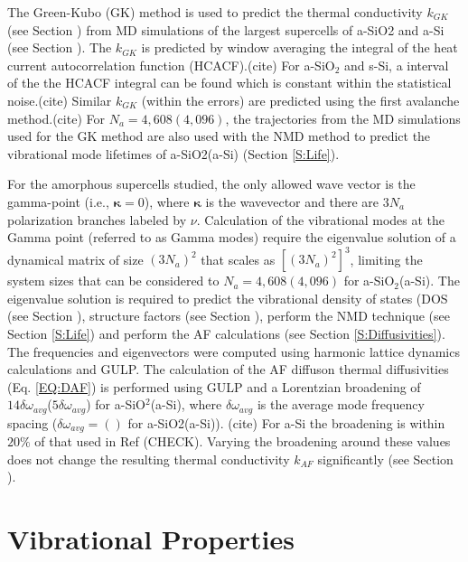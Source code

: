 \documentclass[aps,prb,twocolumn,superscriptaddress,footinbib,amsmath,amssymb,floatfix]{revtex4}
\begin{document}
The Green-Kubo (GK) method is used to predict the thermal 
conductivity $k_{GK}$ (see Section ) from MD simulations of the 
largest supercells of a-SiO2 and a-Si (see Section ). The 
$k_{GK}$ is predicted by window averaging the integral of the heat current 
autocorrelation function (HCACF).(cite) For a-SiO$_2$ and s-Si, a 
interval of the the HCACF integral can be found which is constant 
within the statistical noise.(cite) Similar $k_{GK}$ (within 
the errors) are predicted using the first avalanche method.(cite)  
For $N_a=4,608 (4,096)$, the trajectories from the MD simulations 
used for the GK method are also used with the NMD method to predict 
the vibrational mode lifetimes of a-SiO2(a-Si) (Section \ref{S:Life}). 

For the amorphous supercells studied,
the only allowed wave vector is the gamma-point (i.e., $\pmb{\kappa}=0$),  
where $\pmb{\kappa}$ is the wavevector and there are $3N_a$ polarization 
branches labeled by $\nu$. 
Calculation of the 
vibrational modes at the Gamma point (referred to as Gamma modes) 
require the eigenvalue solution 
of a dynamical matrix of size 
$(3N_a)^2$ that scales as $[(3N_a)^2]^3$, limiting the system 
sizes that can be considered to $N_a = 4,608(4,096)$ for 
a-SiO$_2$(a-Si). 
The eigenvalue solution is required to predict the vibrational 
density of states (DOS (see Section ), structure factors 
(see Section ), perform the NMD technique  
(see Section \ref{S:Life})  
and perform the AF calculations (see Section \ref{S:Diffusivities}). 
The frequencies and eigenvectors were computed using harmonic
lattice dynamics calculations and GULP.\cite{gale_general_2003} 
The calculation of the AF diffuson thermal diffusivities 
(Eq. \eqref{EQ:DAF}) 
is performed using GULP and a Lorentzian 
broadening of $14\delta\omega_{avg}$($5\delta\omega_{avg}$) for 
a-SiO$^2$(a-Si), where $\delta\omega_{avg}$ is the average mode 
frequency spacing ($\delta\omega_{avg} = ()$ for a-SiO2(a-Si)).
(cite) For a-Si the broadening is within $20\%$ of that used 
in Ref (CHECK). 
Varying the broadening around these values does not 
change the resulting thermal conductivity $k_{AF}$ significantly 
(see Section ). 

\section{\label{S:Vibrational}Vibrational Properties}
\end{document}
